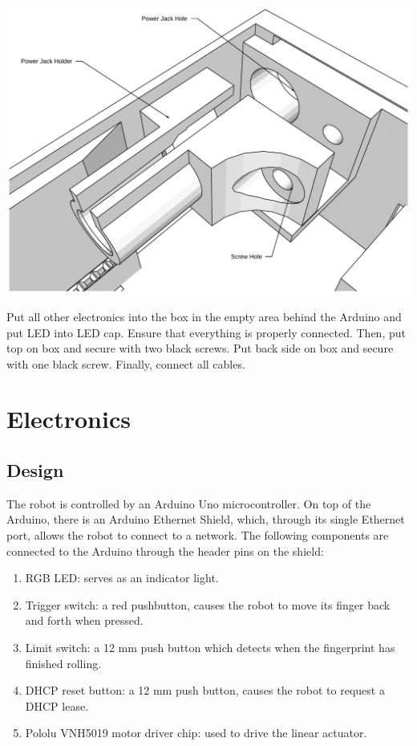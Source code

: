 \documentclass[letterpaper,10pt,english]{sphinxmanual}
\begin{document}
\includegraphics{PowerJackInstallation.pdf}

Put all other electronics into the box in the empty area behind the Arduino and put LED into LED cap. Ensure that everything is properly connected. Then, put top on box and secure with two black screws. Put back side on box and secure with one black screw. Finally, connect all cables.


\section{Electronics}
\label{NARFSTR:electronics}

\subsection{Design}
\label{NARFSTR:id2}
The robot is controlled by an Arduino Uno microcontroller. On top of the Arduino, there is an Arduino Ethernet Shield, which, through its single Ethernet port, allows the robot to connect to a network. The following components are connected to the Arduino through the header pins on the shield:
\begin{enumerate}
\item {} 
RGB LED: serves as an indicator light.

\item {} 
Trigger switch: a red pushbutton, causes the robot to move its finger back and forth when pressed.

\item {} 
Limit switch: a 12 mm push button which detects when the fingerprint has finished rolling.

\item {} 
DHCP reset button: a 12 mm push button, causes the robot to request a DHCP lease.

\item {} 
Pololu VNH5019 motor driver chip: used to drive the linear actuator.

\end{enumerate}
\end{document}
